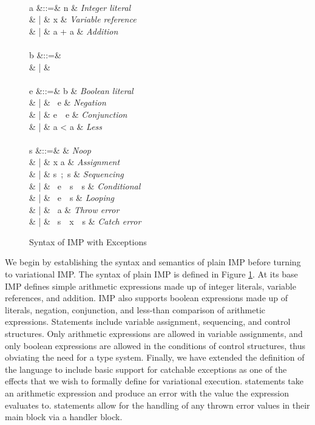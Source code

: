 \documentclass[letterpaper,10pt,onecolumn]{article}
\begin{document}
\begin{figure}
\begin{syntax}
\\
a &::=& n & \textit{Integer literal} \\
& | & x & \textit{Variable reference} \\
& | & a + a & \textit{Addition} \\
 \\
b &::=&  \\
& | &  \\
 \\
e &::=& b & \textit{Boolean literal} \\
& | & \ e & \textit{Negation} \\
& | & e\ \ e & \textit{Conjunction} \\
& | & a < a & \textit{Less} \\
 \\
s &::=&  & \textit{Noop} \\
& | & x \coloneqq a & \textit{Assignment} \\
& | & s\ ;\ s & \textit{Sequencing} \\
& | & \ e\ \ s\ \ s & \textit{Conditional} \\
& | & \ e\ \ s & \textit{Looping} \\
& | & \ a & \textit{Throw error} \\
& | & \ s\ \ x\ \ s & \textit{Catch error}
\end{syntax}
\caption{Syntax of IMP with Exceptions}
\label{fig:impsyn}
\end{figure}

We begin by establishing the syntax and semantics of plain IMP before turning to variational IMP. The syntax of plain IMP is defined in Figure \ref{fig:impsyn}.
At its base IMP defines simple arithmetic expressions made up of integer literals, variable references, and addition. IMP also supports boolean expressions
made up of literals, negation, conjunction, and less-than comparison of arithmetic expressions. Statements include variable assignment, sequencing, and
control structures. Only arithmetic expressions are allowed in variable assignments, and only boolean expressions are allowed in the conditions of control
structures, thus obviating the need for a type system. Finally, we have extended the definition of the language to include basic support for catchable exceptions
as one of the effects that we wish to formally define for variational execution.  statements take an arithmetic expression and produce an
error with the value the expression evaluates to.  statements allow for the handling of any thrown error values in their main block via a
handler block.
\end{document}
